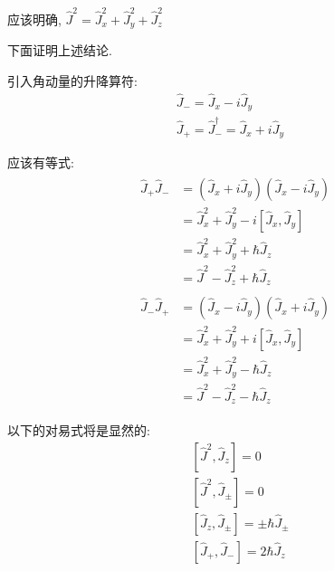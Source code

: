 \documentclass[a4paper, 11pt]{article}
\begin{document}
\begin{spacing}{1.2}
      应该明确, $\hat{J}^2 = \hat{J}_x^2+\hat{J}_y^2+\hat{J}_z^2$

      下面证明上述结论. 

      引入角动量的升降算符:
      \begin{subequations}
        \begin{align}
          \hat{J}_- = \hat{J}_x-i\hat{J}_y&\\
          \hat{J}_+ = \hat{J}_-^{\dagger} =  \hat{J}_x+i\hat{J}_y&
        \end{align}
      \end{subequations}

      应该有等式:
      \begin{subequations}
        \begin{align}
          \begin{aligned}
            \hat{J}_+\hat{J}_- &= \left(\hat{J}_x+i\hat{J}_y\right)\left(\hat{J}_x-i\hat{J}_y\right)\\
                               &= \hat{J}_x^2+\hat{J}_y^2-i\left[\hat{J}_x,\hat{J}_y\right]\\
                               &= \hat{J}_x^2+\hat{J}_y^2+\hbar\hat{J}_z\\
                               &= \hat{J}^2 - \hat{J}_z^2+\hbar\hat{J}_z
          \end{aligned}\\
          \begin{aligned}
            \hat{J}_-\hat{J}_+ &= \left(\hat{J}_x-i\hat{J}_y\right)\left(\hat{J}_x+i\hat{J}_y\right)\\
                               &= \hat{J}_x^2+\hat{J}_y^2+i\left[\hat{J}_x,\hat{J}_y\right]\\
                               &= \hat{J}_x^2+\hat{J}_y^2-\hbar\hat{J}_z\\
                               &= \hat{J}^2-\hat{J}_z^2- \hbar\hat{J}_z
          \end{aligned}
        \end{align}
      \end{subequations}

      以下的对易式将是显然的:
      \begin{subequations}
        \label{4764:ee}
        \begin{align}
          &\left[\hat{J}^2, \hat{J}_{z}\right] = 0 \\
          &\left[\hat{J}^2, \hat{J}_{\pm}\right] = 0\\
          &\left[\hat{J}_z, \hat{J}_{\pm}\right] = \pm{}\hbar\hat{J}_{\pm}\\
          &\left[\hat{J}_{+}, \hat{J}_{-}\right] = 2\hbar\hat{J}_z
        \end{align}
      \end{subequations}


\end{spacing}
\end{document}
